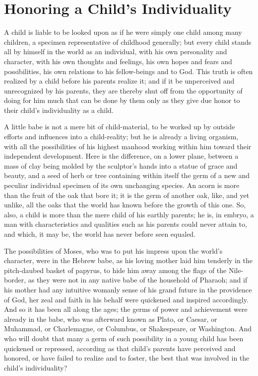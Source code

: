 \documentclass[
]{book}
\begin{document}
\hypertarget{honoring-a-childs-individuality}{%
\chapter{Honoring a Child's Individuality}\label{honoring-a-childs-individuality}}

A child is liable to be looked upon as if he were simply one child among many children, a specimen representative of childhood generally; but every child stands all by himself in the world as an individual, with his own personality and character, with his own thoughts and feelings, his own hopes and fears and possibilities, his own relations to his fellow-beings and to God. This truth is often realized by a child before his parents realize it; and if it be unperceived and unrecognized by his parents, they are thereby shut off from the opportunity of doing for him much that can be done by them only as they give due honor to their child's individuality as a child.

A little babe is not a mere bit of child-material, to be worked up by outside efforts and influences into a child-reality; but he is already a living organism, with all the possibilities of his highest manhood working within him toward their independent development. Here is the difference, on a lower plane, between a mass of clay being molded by the sculptor's hands into a statue of grace and beauty, and a seed of herb or tree containing within itself the germ of a new and peculiar individual specimen of its own unchanging species. An acorn is more than the fruit of the oak that bore it; it is the germ of another oak, like, and yet unlike, all the oaks that the world has known before the growth of this one. So, also, a child is more than the mere child of his earthly parents; he is, in embryo, a man with characteristics and qualities such as his parents could never attain to, and which, it may be, the world has never before seen equaled.

The possibilities of Moses, who was to put his impress upon the world's character, were in the Hebrew babe, as his loving mother laid him tenderly in the pitch-daubed basket of papyrus, to hide him away among the flags of the Nile-border, as they were not in any native babe of the household of Pharaoh; and if his mother had any intuitive womanly sense of his grand future in the providence of God, her zeal and faith in his behalf were quickened and inspired accordingly. And so it has been all along the ages; the germs of power and achievement were already in the babe, who was afterward known as Plato, or Caesar, or Muhammad, or Charlemagne, or Columbus, or Shakespeare, or Washington. And who will doubt that many a germ of such possibility in a young child has been quickened or repressed, according as that child's parents have perceived and honored, or have failed to realize and to foster, the best that was involved in the child's individuality?
\end{document}
